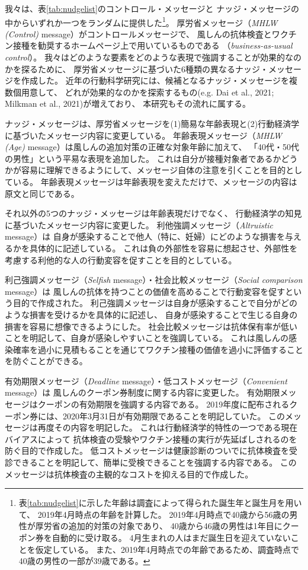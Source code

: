 \documentclass[
  11pt,
  a4paper,
]{article}
\begin{document}
我々は、表\ref{tab:nudgelist}のコントロール・メッセージと
ナッジ・メッセージの中からいずれか一つをランダムに提供した\footnote{表\ref{tab:nudgelist}に示した年齢は調査によって得られた誕生年と誕生月を用いて、
  2019年4月時点の年齢を計算した。
  2019年4月時点で40歳から56歳の男性が厚労省の追加的対策の対象であり、
  40歳から46歳の男性は1年目にクーポン券を自動的に受け取る。
  4月生まれの人はまだ誕生日を迎えていないことを仮定している。
  また、2019年4月時点での年齢であるため、調査時点で40歳の男性の一部が39歳である。}。
厚労省メッセージ（\emph{MHLW (Control)} message）がコントロールメッセージで、
風しんの抗体検査とワクチン接種を勧奨するホームページ上で用いているものである
（\emph{business-as-usual control}）。
我々はどのような要素をどのような表現で強調することが効果的なのかを探るために、
厚労省メッセージに基づいた6種類の異なるナッジ・メッセージを作成した。
近年の行動科学研究には、候補となるナッジ・メッセージを複数個用意して、
どれが効果的なのかを探索するもの(e.g. Dai et al., 2021; Milkman et al., 2021)が増えており、
本研究もその流れに属する。

ナッジ・メッセージは、厚労省メッセージを(1)簡易な年齢表現と(2)行動経済学に基づいたメッセージ内容に変更している。
年齢表現メッセージ（\emph{MHLW (Age)} message）は風しんの追加対策の正確な対象年齢に加えて、
「40代・50代の男性」という平易な表現を追加した。
これは自分が接種対象者であるかどうかが容易に理解できるようにして、メッセージ自体の注意を引くことを目的としている。
年齢表現メッセージは年齢表現を変えただけで、メッセージの内容は原文と同じである。

それ以外の5つのナッジ・メッセージは年齢表現だけでなく、
行動経済学の知見に基づいたメッセージ内容に変更した。
利他強調メッセージ（\emph{Altruistic} message）は
自身が感染することで他人（特に、妊婦）にどのような損害を与えるかを具体的に記述している。
これは負の外部性を容易に想起させ、外部性を考慮する利他的な人の行動変容を促すことを目的としている。

利己強調メッセージ（\emph{Selfish} message）・社会比較メッセージ（\emph{Social comparison} message）は
風しんの抗体を持つことの価値を高めることで行動変容を促すという目的で作成された。
利己強調メッセージは自身が感染することで自分がどのような損害を受けるかを具体的に記述し、
自身が感染することで生じる自身の損害を容易に想像できるようにした。
社会比較メッセージは抗体保有率が低いことを明記して、自身が感染しやすいことを強調している。
これは風しんの感染確率を過小に見積もることを通じてワクチン接種の価値を過小に評価することを防ぐことができる。

有効期限メッセージ（\emph{Deadline} message）・低コストメッセージ（\emph{Convenient} message）は
風しんのクーポン券制度に関する内容に変更した。
有効期限メッセージはクーポンの有効期限を強調する内容である。
2019年度に配布されるクーポン券には、2020年3月31日が有効期限であることを明記していた。
このメッセージは再度その内容を明記した。
これは行動経済学的特性の一つである現在バイアスによって
抗体検査の受験やワクチン接種の実行が先延ばしされるのを防ぐ目的で作成した。
低コストメッセージは健康診断のついでに抗体検査を受診できることを明記して、簡単に受検できることを強調する内容である。
このメッセージは抗体検査の主観的なコストを抑える目的で作成した。
\end{document}
